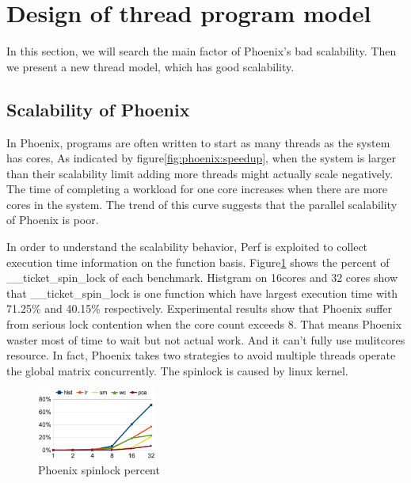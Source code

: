 \section{Design of thread program model}
{\color{red}In this section, we will search the main factor of Phoenix's bad scalability.
Then we present a new thread model, which has good scalability.
}



\subsection{Scalability of Phoenix}
In Phoenix, programs are often written to start as many threads as the system has cores,
As indicated by figure\ref{fig:phoenix:speedup}, 
when the system is larger than their scalability limit 
adding more threads might actually scale negatively.
The time of completing a workload for one core increases 
when there are more cores in the system. 
The trend of this curve suggests that
the parallel scalability of Phoenix is poor.

In order to understand the scalability behavior, 
Perf\cite{} is exploited to collect execution time information
on the function basis. 
Figure\ref{fig:phoenix:spinlock} shows the percent of \_\_ticket\_spin\_lock of each benchmark.
Histgram on 16cores and 32 cores
show that \_\_ticket\_spin\_lock is one function 
which have largest execution time with 71.25\% and 40.15\% respectively. 
Experimental results show that Phoenix suffer from serious lock contention
when the core count exceeds 8.
That means Phoenix waster most of time to wait but not actual work.
And it can't fully use mulitcores resource.
In fact, Phoenix takes two strategies to avoid multiple threads operate the global matrix concurrently.
The spinlock is caused by linux kernel.
\begin{figure}[!h!t]  
    \centering
    \includegraphics[width=0.35\textwidth]{eps/phoenix_spinlock.eps}
    \caption{Phoenix spinlock percent}
    \label{fig:phoenix:spinlock}
\end{figure}


